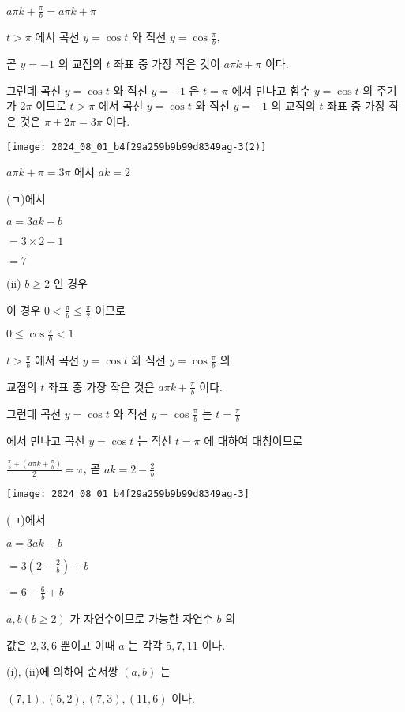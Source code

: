 \documentclass[10pt]{article}
\begin{document}
$a \pi k+\frac{\pi}{b}=a \pi k+\pi$

$t>\pi$ 에서 곡선 $y=\cos t$ 와 직선 $y=\cos \frac{\pi}{b}$,

곧 $y=-1$ 의 교점의 $t$ 좌표 중 가장 작은 것이 $a \pi k+\pi$ 이다.

그런데 곡선 $y=\cos t$ 와 직선 $y=-1$ 은 $t=\pi$ 에서 만나고 함수 $y=\cos t$ 의 주기가 $2 \pi$ 이므로 $t>\pi$ 에서 곡선 $y=\cos t$ 와 직선 $y=-1$ 의 교점의 $t$ 좌표 중 가장 작은 것은 $\pi+2 \pi=3 \pi$ 이다.

\begin{center}
\texttt{[image: 2024\_08\_01\_b4f29a259b9b99d8349ag-3(2)]}
\end{center}

$a \pi k+\pi=3 \pi$ 에서 $a k=2$

(ㄱ)에서

$a=3 a k+b$

$=3 \times 2+1$

$=7$

(ii) $b \geq 2$ 인 경우

이 경우 $0<\frac{\pi}{b} \leq \frac{\pi}{2}$ 이므로

$0 \leq \cos \frac{\pi}{b}<1$

$t>\frac{\pi}{b}$ 에서 곡선 $y=\cos t$ 와 직선 $y=\cos \frac{\pi}{b}$ 의

교점의 $t$ 좌표 중 가장 작은 것은 $a \pi k+\frac{\pi}{b}$ 이다.

그런데 곡선 $y=\cos t$ 와 직선 $y=\cos \frac{\pi}{b}$ 는 $t=\frac{\pi}{b}$

에서 만나고 곡선 $y=\cos t$ 는 직선 $t=\pi$ 에 대하여 대칭이므로

$\frac{\frac{\pi}{b}+\left(a \pi k+\frac{\pi}{b}\right)}{2}=\pi$, 곧 $a k=2-\frac{2}{b}$

\begin{center}
\texttt{[image: 2024\_08\_01\_b4f29a259b9b99d8349ag-3]}
\end{center}

(ㄱ)에서

$a=3 a k+b$

$=3\left(2-\frac{2}{b}\right)+b$

$=6-\frac{6}{b}+b$

$a, b(b \geq 2)$ 가 자연수이므로 가능한 자연수 $b$ 의

값은 $2,3,6$ 뿐이고 이때 $a$ 는 각각 $5,7,11$ 이다.

(i), (ii)에 의하여 순서쌍 $(a, b)$ 는

$(7,1),(5,2),(7,3),(11,6)$ 이다.
\end{document}
